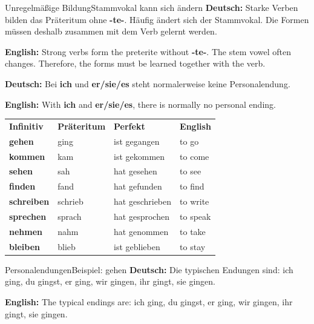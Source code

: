 \documentclass[a4paper,11pt]{article}
\newcommand{\GermanText}[1]{\textbf{Deutsch: }#1\par}
\newcommand{\EnglishText}[1]{{\small\color{SoftGray}\textbf{English: }#1\par}}
\begin{document}
        \begin{grammarentry}{Unregelmäßige Bildung}{Stammvokal kann sich ändern}
            \GermanText{Starke Verben bilden das Präteritum ohne \textbf{-te-}. Häufig ändert sich der Stammvokal. Die Formen müssen deshalb zusammen mit dem Verb gelernt werden.}
            \EnglishText{Strong verbs form the preterite without \textbf{-te-}. The stem vowel often changes. Therefore, the forms must be learned together with the verb.}
            
            \GermanText{Bei \textbf{ich} und \textbf{er/sie/es} steht normalerweise keine Personalendung.}
            \EnglishText{With \textbf{ich} and \textbf{er/sie/es}, there is normally no personal ending.}
        \end{grammarentry}
        
        \begin{longtable}{>{\bfseries}p{2.5cm}|p{3cm}|p{3cm}|p{5.2cm}}
            \rowcolor{HeaderBlueDark}
            \color{white}\textbf{Infinitiv} &
            \color{white}\textbf{Präteritum} &
            \color{white}\textbf{Perfekt} &
            \color{white}\textbf{English} \\
            gehen & ging & ist gegangen & to go \\
            kommen & kam & ist gekommen & to come \\
            sehen & sah & hat gesehen & to see \\
            finden & fand & hat gefunden & to find \\
            schreiben & schrieb & hat geschrieben & to write \\
            sprechen & sprach & hat gesprochen & to speak \\
            nehmen & nahm & hat genommen & to take \\
            bleiben & blieb & ist geblieben & to stay \\
        \end{longtable}
        
        \begin{grammarentry}{Personalendungen}{Beispiel: gehen}
            \GermanText{Die typischen Endungen sind: ich ging, du gingst, er ging, wir gingen, ihr gingt, sie gingen.}
            \EnglishText{The typical endings are: ich ging, du gingst, er ging, wir gingen, ihr gingt, sie gingen.}
        \end{grammarentry}
    
\end{document}
